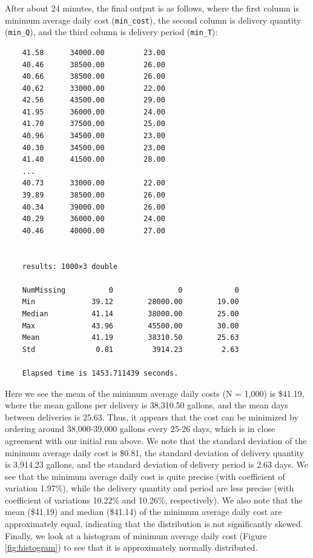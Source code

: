 \documentclass{article}
\begin{document}
    After about 24 minutes, the final output is as follows, where the first column is minimum average daily cost (\texttt{min\_cost}), the second column is delivery quantity (\texttt{min\_Q}), and the third column is delivery period (\texttt{min\_T}):

    \begin{verbatim}
    41.58      34000.00         23.00
    40.46      38500.00         26.00
    40.66      38500.00         26.00
    40.62      33000.00         22.00
    42.56      43500.00         29.00
    41.95      36000.00         24.00
    41.70      37500.00         25.00
    40.96      34500.00         23.00
    40.30      34500.00         23.00
    41.40      41500.00         28.00
    ...
    40.73      33000.00         22.00
    39.89      38500.00         26.00
    40.34      39000.00         26.00
    40.29      36000.00         24.00
    40.46      40000.00         27.00


    results: 1000×3 double

    NumMissing          0               0            0
    Min             39.12        28000.00        19.00
    Median          41.14        38000.00        25.00
    Max             43.96        45500.00        30.00
    Mean            41.19        38310.50        25.63
    Std              0.81         3914.23         2.63

    Elapsed time is 1453.711439 seconds.\end{verbatim}
    \pagebreak
    Here we see the mean of the minimum average daily costs (N = 1,000) is \$41.19, where the mean gallons per delivery is 38,310.50 gallons, and the mean days between deliveries is 25.63. Thus, it appears that the cost can be minimized by ordering around 38,000-39,000 gallons every 25-26 days, which is in close agreement with our initial run above. We note that the standard deviation of the minimum average daily cost is \$0.81, the standard deviation of delivery quantity is 3,914.23 gallons, and the standard deviation of delivery period is 2.63 days. We see that the minimum average daily cost is quite precise (with coefficient of variation 1.97\%), while the delivery quantity and period are less precise (with coefficient of variations 10.22\% and 10.26\%, respectively). We also note that the mean (\$41.19) and median (\$41.14) of the minimum average daily cost are approximately equal, indicating that the distribution is not significantly skewed. Finally, we look at a histogram of minimum average daily cost (Figure \ref{fig:histogram}) to see that it is approximately normally distributed.
\end{document}

